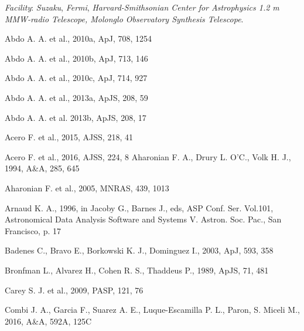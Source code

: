 \documentclass[useAMS,usenatbib]{mn2e}
\begin{document}
{\it Facility}: {\it Suzaku}, {\it Fermi}, {\it Harvard-Smithsonian Center for Astrophysics 1.2 m MMW-radio Telescope, Molonglo Observatory Synthesis Telescope}. 


\begin{thebibliography}{99}


 Abdo A. A. et al., 2010a, ApJ, 708, 1254

 Abdo A. A. et al., 2010b, ApJ, 713, 146

 Abdo A. A. et al., 2010c, ApJ, 714, 927

 Abdo A. A. et al., 2013a, ApJS, 208, 59 

 Abdo A. A. et al. 2013b, ApJS, 208, 17

 Acero F. et al., 2015, AJSS, 218, 41 

 Acero F. et al., 2016, AJSS, 224, 8 
Aharonian F. A., Drury L. O’C., Volk H. J., 1994, A\&A, 285, 645 

 Aharonian F. et al., 2005, MNRAS, 439, 1013 


 Arnaud K. A., 1996, in Jacoby G., Barnes J., eds, ASP Conf. Ser. Vol.101, Astronomical Data Analysis Software and Systems V. Astron. Soc. Pac., San Francisco, p. 17

Badenes C., Bravo E., Borkowski K. J., Dominguez I., 2003, ApJ, 593, 358

 Bronfman L., Alvarez H., Cohen R. S., Thaddeus P., 1989, ApJS, 71, 481

Carey S. J. et al., 2009, PASP, 121, 76

Combi J. A., Garcia F., Suarez A. E., Luque-Escamilla P. L., Paron, S. Miceli M., 2016, A\&A, 592A, 125C


\end{thebibliography}
\end{document}
